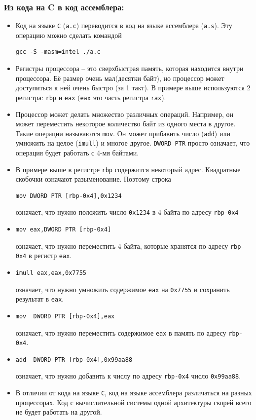 \documentclass[10pt]{article}
\begin{document}
\subsubsection*{Из кода на C в код ассемблера:}
\begin{itemize}
\item Код на языке \texttt{C} (\texttt{a.c}) переводится в код на языке ассемблера (\texttt{a.s}). Эту операцию можно сделать командой
\begin{verbatim}
gcc -S -masm=intel ./a.c
\end{verbatim}
\item Регистры процессора -- это сверхбыстрая память, которая находится внутри процессора. Её размер очень мал(десятки байт), но процессор может доступиться к ней очень быстро (за 1 такт). В примере выше используются 2 регистра: \texttt{rbp} и \texttt{eax} (\texttt{eax} это часть регистра \texttt{rax}). 
\item Процессор может делать множество различных операций. Например, он может переместить некоторое количество байт из одного места в другое. Такие операции называются \texttt{mov}. Он может прибавить число (\texttt{add}) или умножить на целое (\texttt{imull}) и многое другое. \texttt{DWORD PTR} просто означает, что операция будет работать с 4-мя байтами.
\item В примере выше в регистре \texttt{rbp} содержится некоторый адрес. Квадратные скобочки означают разыменование. Поэтому строка
\begin{verbatim}
mov DWORD PTR [rbp-0x4],0x1234
\end{verbatim}
означает, что нужно положить число \texttt{0x1234} в 4 байта по адресу \texttt{rbp-0x4}
\item 
\begin{verbatim}
mov eax,DWORD PTR [rbp-0x4]
\end{verbatim}
означает, что нужно переместить 4 байта, которые хранятся по адресу \texttt{rbp-0x4} в регистр \texttt{eax}.
\item
\begin{verbatim}
imull eax,eax,0x7755
\end{verbatim}
означает, что нужно умножить содержимое \texttt{eax} на \texttt{0x7755} и сохранить результат в \texttt{eax}.
\item
\begin{verbatim}
mov  DWORD PTR [rbp-0x4],eax
\end{verbatim}
означает, что нужно переместить содержимое \texttt{eax} в память по адресу \texttt{rbp-0x4}.
\item
\begin{verbatim}
add  DWORD PTR [rbp-0x4],0x99aa88
\end{verbatim}
означает, что нужно добавить к числу по адресу \texttt{rbp-0x4} число \texttt{0x99aa88}.
\item В отличии от кода на языке \texttt{C}, код на языке ассемблера различаться на разных процессорах. Код с  вычислительной системы одной архитектуры скорей всего не будет работать на другой.
\end{itemize}
\end{document}
